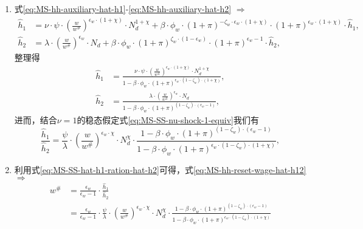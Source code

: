 \begin{enumerate}
\item 式\eqref{eq:MS-hh-auxiliary-hat-h1}-\eqref{eq:MS-hh-auxiliary-hat-h2} $\Rightarrow$
\begin{align*}
\hat{h}_{1} &= \nu \cdot \psi \cdot \left(\frac{w}{w^{\#}}\right)^{\epsilon_w \cdot \left( 1 + \chi \right)} \cdot N_{d}^{1+\chi} + \beta \cdot \phi_w \cdot \left( 1 + \pi \right)^{-\zeta_w \cdot \epsilon_w \cdot \left(1 + \chi \right)} \cdot \left( 1 + \pi \right)^{\epsilon_w \cdot \left(1 + \chi \right)} \cdot \hat{h}_{1},\\
\hat{h}_2 &= \lambda \cdot \left(\frac{w}{w^{\#}}\right)^{\epsilon_w} \cdot N_{d} + \beta \cdot \phi_w \cdot \left(1+\pi \right)^{\zeta_w \cdot \left( 1 - \epsilon_w \right)} \cdot \left(1+\pi \right)^{\epsilon_w - 1} \cdot \hat{h}_{2},
\end{align*}
整理得
\begin{align}
\label{eq:MS-SS-hh-auxiliary-hat-h1}
\hat{h}_{1} &= \frac{
  \nu \cdot \psi \cdot \left(\frac{w}{w^{\#}}\right)^{\epsilon_w \cdot \left( 1 + \chi \right)} \cdot N_{d}^{1+\chi}
}{
1 - \beta \cdot \phi_w \cdot \left( 1 + \pi \right)^{\epsilon_w \cdot \left( 1 - \zeta_w \right) \cdot \left(1 + \chi \right)}
}, \\
\label{eq:MS-SS-hh-auxiliary-hat-h2}
\hat{h}_{2} &= \frac{
  \lambda \cdot \left(\frac{w}{w^{\#}}\right)^{\epsilon_w} \cdot N_{d}
}{
  1 - \beta \cdot \phi_w \cdot \left( 1 + \pi \right)^{\left( 1 - \zeta_w \right) \cdot \left( \epsilon_w - 1\right)}
},
\end{align}
进而，结合$\nu = 1$的稳态假定式\eqref{eq:MS-SS-nu-shock-1-equiv}我们有
\begin{equation}
\label{eq:MS-SS-hat-h1-ration-hat-h2}
\frac{\hat{h}_{1}}{\hat{h}_{2}} =
\frac{\psi}{\lambda}
\cdot \left(\frac{w}{w^{\#}}\right)^{\epsilon_w \cdot \chi} \cdot N_{d}^{\chi}
\cdot \frac{
  1 - \beta \cdot \phi_w \cdot \left( 1 + \pi \right)^{\left( 1 - \zeta_w \right) \cdot \left(\epsilon_w - 1 \right)}
}{
  1 - \beta \cdot \phi_w \cdot \left( 1 + \pi \right)^{\epsilon_w \cdot \left( 1 - \zeta_w \right) \cdot \left(1 + \chi \right)}
  },
\end{equation}

\item 利用式\eqref{eq:MS-SS-hat-h1-ration-hat-h2}可得，式\eqref{eq:MS-hh-reset-wage-hat-h12} $\Rightarrow$
\begin{equation}
\label{eq:MS-SS-hh-reset-wage-hat-h12}
\begin{split}
w^{\#} &= \frac{\epsilon_w}{\epsilon_w -1} \cdot \frac{\hat{h}_{1}}{\hat{h}_{2}}  \\
&= \frac{\epsilon_w}{\epsilon_w -1} \cdot
\frac{\psi}{\lambda}
\cdot \left(\frac{w}{w^{\#}}\right)^{\epsilon_w \cdot \chi} \cdot N_{d}^{\chi}
\cdot \frac{
  1 - \beta \cdot \phi_w \cdot \left( 1 + \pi \right)^{\left( 1 - \zeta_w \right) \cdot \left(\epsilon_w - 1 \right)}
}{
  1 - \beta \cdot \phi_w \cdot \left( 1 + \pi \right)^{\epsilon_w \cdot \left( 1 - \zeta_w \right) \cdot \left(1 + \chi \right)}
  }
\end{split}
\end{equation}


\end{enumerate}
